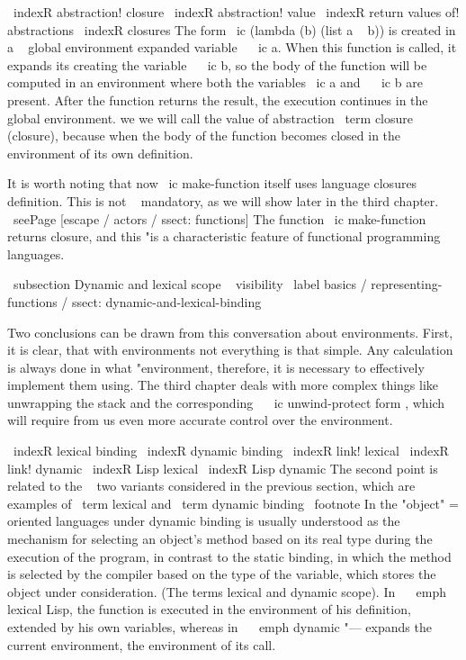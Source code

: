 {{\ indexR {abstraction! closure}
\ indexR {abstraction! value}
\ indexR {return values ​​of! abstractions}
\ indexR {closures}
The form \ ic {(lambda (b) (list a ~ b))} is created in a ~ global environment expanded
variable ~ \ ic {a}. When this function is called, it expands its
creating the variable ~ \ ic {b}, so the body of the function will be computed
in an environment where both the variables \ ic {a} and ~ \ ic {b} are present. After
the function returns the result, the execution continues in the global environment. we
we will call the value of abstraction \ term {closure} (closure), because when
the body of the function becomes closed in the environment of its own
definition.

It is worth noting that now \ ic {make-function} itself uses language closures
definition. This is not ~ mandatory, as we will show later in the third chapter.
\ seePage [escape / actors / ssect: functions] The function \ ic {make-function} returns
closure, and this "is a characteristic feature of functional programming languages.


\ subsection {Dynamic and lexical scope ~ visibility} %
\ label {basics / representing-functions / ssect: dynamic-and-lexical-binding}

Two conclusions can be drawn from this conversation about environments. First, it is clear,
that with environments not everything is that simple. Any calculation is always done
in what "environment, therefore, it is necessary to effectively implement them
using. The third chapter deals with more complex things like
unwrapping the stack and the corresponding ~ \ ic {unwind-protect} form , which will require
from us even more accurate control over the environment.

\ indexR {lexical binding} \ indexR {dynamic binding}
\ indexR {link! lexical} \ indexR {link! dynamic}
\ indexR {Lisp lexical} \ indexR {Lisp dynamic}
The second point is related to the ~ two variants considered in the previous section,
which are examples of \ term {lexical} and \ term {dynamic
binding} \ footnote {In the "object" = oriented languages ​​under dynamic
binding is usually understood as the mechanism for selecting an object's method based on its
real type during the execution of the program, in contrast to the static
binding, in which the method is selected by the compiler based on the type of the variable,
which stores the object under consideration.} (The terms lexical and
dynamic scope). In ~ \ emph {lexical} Lisp, the function is executed
in the environment of his definition, extended by his own variables, whereas
in ~ \ emph {dynamic} "--- expands the current environment, the environment of its call.

}}
